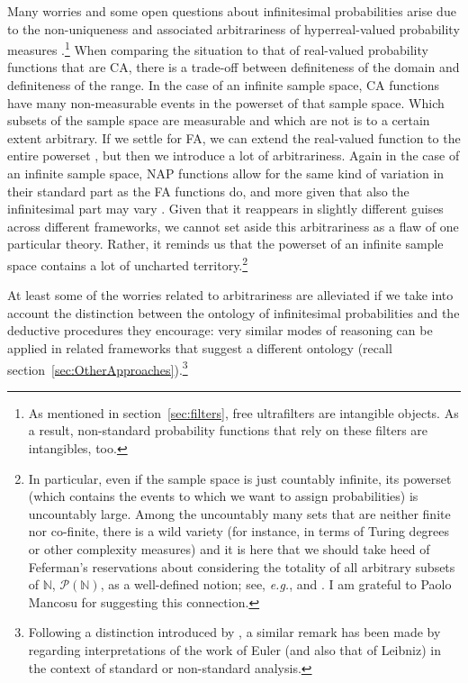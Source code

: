Many worries and some open questions about infinitesimal probabilities arise due to the non-uniqueness and associated arbitrariness of hyperreal-valued probability measures \citep[also discussed, \textit{e.g.}, by][]{Hofweber:2014}.\footnote{As mentioned in section~\ref{sec:filters}, free ultrafilters are intangible objects. As a result, non-standard probability functions that rely on these filters are intangibles, too.} When comparing the situation to that of real-valued probability functions that are CA, there is a trade-off between definiteness of the domain and definiteness of the range. In the case of an infinite sample space, CA functions have many non-measurable events in the powerset of that sample space. Which subsets of the sample space are measurable and which are not is to a certain extent arbitrary. If we settle for FA, we can extend the real-valued function to the entire powerset \citep[by considering Banach limits, see for instance,][]{SchurzLeitgeb:2008}, but then we introduce a lot of arbitrariness. Again in the case of an infinite sample space, NAP functions allow for the same kind of variation in their standard part as the FA functions do, and more given that also the infinitesimal part may vary \citep[see for instance][]{Kremer:2014}. Given that it reappears in slightly different guises across different frameworks, we cannot set aside this arbitrariness as a flaw of one particular theory. Rather, it reminds us that the powerset of an infinite sample space contains a lot of uncharted territory.\footnote{In particular, even if the sample space is just countably infinite, its powerset (which contains the events to which we want to assign probabilities) is uncountably large. Among the uncountably many sets that are neither finite nor co-finite, there is a wild variety (for instance, in terms of Turing degrees or other complexity measures) and it is here that we should take heed of Feferman's reservations about considering the totality of all arbitrary subsets of $\mathbb{N}$, $\mathcal{P}(\mathbb{N})$, as a well-defined notion; see, \textit{e.g.}, \citet[p.~166]{Feferman:1979} and \citet{Feferman:1999}. I am grateful to Paolo Mancosu for suggesting this connection.}

At least some of the worries related to arbitrariness are alleviated if we take into account the distinction between the ontology of infinitesimal probabilities and the deductive procedures they encourage: very similar modes of reasoning can be applied in related frameworks that suggest a different ontology (recall section~\ref{sec:OtherApproaches}).\footnote{Following a distinction introduced by \citet{Benacerraf:1965}, a similar remark has been made by \citet[section~2.3]{Katz:201x} regarding interpretations of the work of Euler (and also that of Leibniz) in the context of standard or non-standard analysis.}

